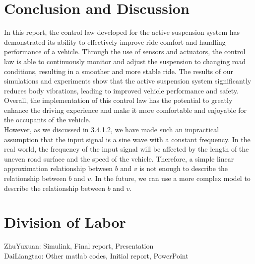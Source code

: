 \documentclass{article}
\begin{document}
\section{Conclusion and Discussion}

In this report,
the control law developed for the active suspension system 
has demonstrated its ability to effectively improve ride comfort 
and handling performance of a vehicle. 
Through the use of sensors and actuators, 
the control law is able to continuously monitor 
and adjust the suspension to changing road conditions, 
resulting in a smoother and more stable ride. 
The results of our simulations and experiments show that 
the active suspension system significantly reduces body vibrations,
leading to improved vehicle performance and safety. 
Overall, the implementation of this control law has the potential to 
greatly enhance the driving experience and make it more comfortable and enjoyable 
for the occupants of the vehicle.\\

However,
as we discussed in 3.4.1.2,
we have made such an impractical assumption that
the input signal is a sine wave with a constant frequency.
In the real world,
the frequency of the input signal will be affected by the length of the uneven road surface
and the speed of the vehicle.
Therefore,
a simple linear approximation relationship between $b$ and $v$ is not enough to describe the relationship between $b$ and $v$.
In the future,
we can use a more complex model to describe the relationship between $b$ and $v$.

\section{Division of Labor}

ZhuYuxuan: Simulink, Final report, Presentation\\

DaiLiangtao: Other matlab codes, Initial report, PowerPoint\\

\end{document}
